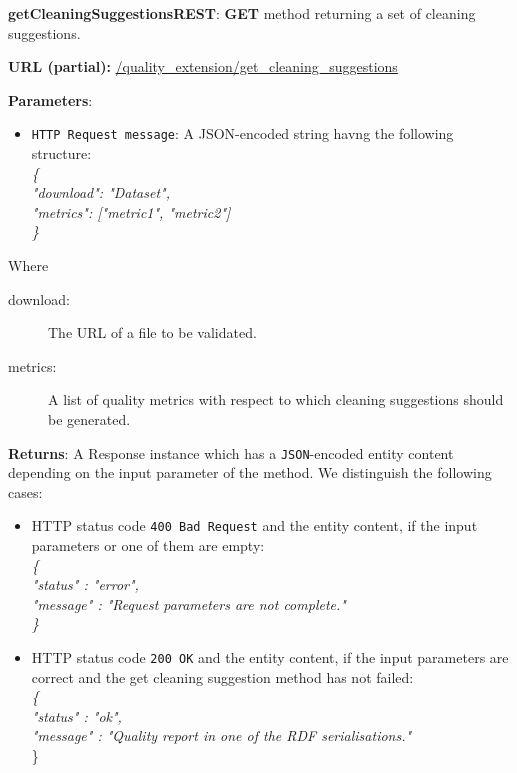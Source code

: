\begin{description}

\item{\textbf{getCleaningSuggestionsREST}:} \textbf{GET} method returning a set of cleaning suggestions.

\textbf{URL (partial):} \url{/quality_extension/get_cleaning_suggestions} 

\textbf{Parameters}: 
\begin{itemize}
\item \texttt{HTTP Request message}: A JSON-encoded string havng the following structure: \\
\hspace*{0.2 cm}\textit{\{}\\
\hspace*{0.5 cm}\textit{"download": "Dataset",} \\
\hspace*{0.5 cm}\textit{"metrics": ["metric1", "metric2"]}  \\
\hspace*{0.2 cm}\textit{\}} \\
\end{itemize}
Where
\begin{description}
\item[download:] The URL of a file to be validated. 
\item[metrics:] A list of quality metrics with respect to which cleaning suggestions should be generated. 
\end{description}


\textbf{Returns}: A Response instance which has a \texttt{JSON}-encoded entity content depending on the input parameter of the method. We distinguish the following cases: 
\begin{itemize}
\item  HTTP status code \texttt{400 Bad Request} and the entity content, if the input parameters or one of them are empty:\\ \hspace*{0.2 cm}\textit{\{}\\
\hspace*{0.5 cm} \textit{"status" : "error",}\\
\hspace*{0.5 cm} \textit{"message" : "Request parameters are not complete."}\\ \hspace*{0.2 cm} \textit{\}}

\item  HTTP status code \texttt{200 OK} and the entity content, if the input parameters are correct and the get cleaning suggestion method has not failed:\\ \hspace*{0.2 cm} \textit{\{}\\
 \hspace*{0.5 cm}\textit{"status" : "ok",}\\ 
 \hspace*{0.5 cm}\textit{"message" : "Quality report in one of the RDF serialisations."} \\ \hspace*{0.2 cm} \}


\end{itemize}
\end{description}
